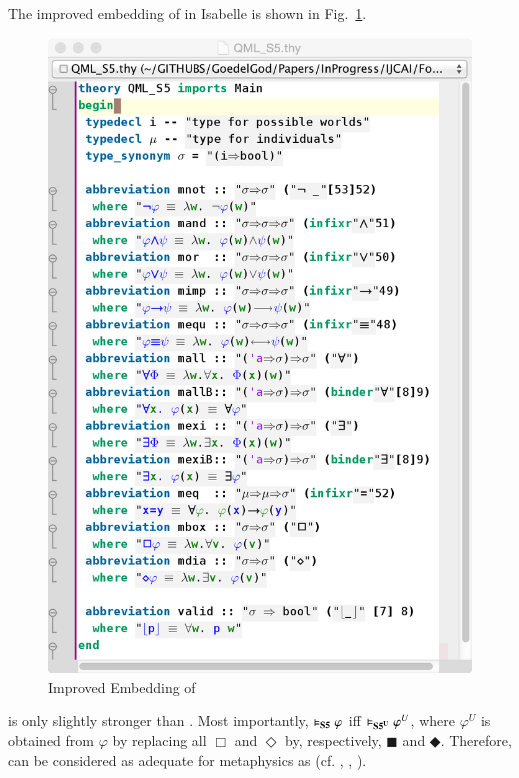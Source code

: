 \documentclass{article}
\newcommand{\Dia}{\Diamond} %
\newcommand{\BlackBox}{\blacksquare}
\newcommand{\BlackDia}{\Diamondblack}
\begin{document}
The improved embedding of \SFiveU in Isabelle is shown in Fig.~\ref{QMLS5}.
\begin{figure}
\centerline{\includegraphics[width=\columnwidth]{./Images/QMLS5.png}}
\caption{Improved Embedding of \SFiveU} \label{QMLS5}
\end{figure}

\SFiveU is only slightly stronger than \SFive. Most importantly, $\vDash_{\textbf{S5}} \varphi$ iff $\vDash_{\textbf{S5\textsuperscript{U}}} \varphi^{U}$, where $\varphi^U$ is obtained from $\varphi$ by replacing all $\Box$ and $\Dia$ by, respectively, $\BlackBox$ and $\BlackDia$. Therefore, \SFiveU can be considered as adequate for metaphysics as \SFive (cf. \cite{Mattey}, \cite[p. 127]{WilliamsonModalLogicAsMetaphysics}, \cite[ToDo]{DunnHardegree}). 
\end{document}
